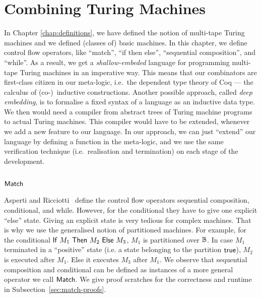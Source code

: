 \chapter{Combining Turing Machines}
\label{chap:combining}

In Chapter \ref{chap:definitions}, we have defined the notion of multi-tape Turing machines and we defined (classes of) basic machines.  In this
chapter, we define control flow operators, like ``match'', ``if then else'', ``sequential composition'', and ``while''.  As a result, we get a
\textit{shallow-embeded} language for programming multi-tape Turing machines in an imperative way.  This means that our combinators are first-class
citizen in our meta-logic, i.e.\ the dependent type theory of Coq --- the calculus of (co-)~inductive constructions.  Another possible approach, called
\textit{deep embedding}, is to formalise a fixed syntax of a language as an inductive data type.  We then would need a compiler from abstract trees of
Turing machine programs to actual Turing machines.  This compiler would have to be extended, whenever we add a new feature to our language.  In our
approach, we can just ``extend'' our language by defining a function in the meta-logic, and we use the same verification technique (i.e.\ realisation
and termination) on each stage of the development.


\section{$\mathsf{Match}$}
\label{sec:match}


Asperti and Ricciotti~\cite{asperti2015} define the control flow operators sequential composition, conditional, and while.  However, for the
conditional they have to give one explicit ``else'' state.  Giving an explicit state is very tedious for complex machines.  That is why we use the
generalised notion of partitioned machines.  For example, for the conditional $\mathsf{If}~M_1~\mathsf{Then}~M_2~\mathsf{Else}~M_3$, $M_1$ is partitioned over $\mathbb{B}$.  In case $M_1$
terminated in a ``positive'' state (i.e. a state belonging to the partition $\mathsf{true}$), $M_2$ is executed after $M_1$.  Else it executes $M_3$ after
$M_1$.  We observe that sequential composition and conditional can be defined as instances of a more general operator we call $\mathsf{Match}$.  We give
proof scratches for the correctness and runtime in Subsection~\ref{sec:match-proofs}.

